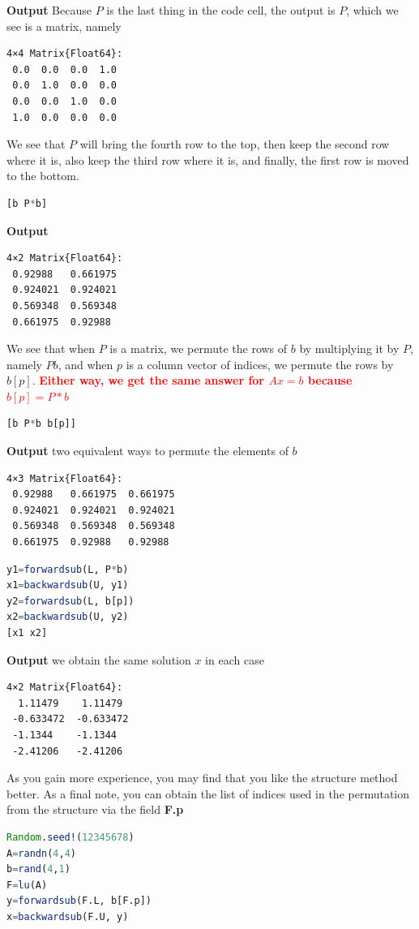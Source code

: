 \begin{itemize}
\textbf{Output} Because $P$ is the last thing in the code cell, the output is $P$, which we see is a matrix, namely
\begin{verbatim}
4×4 Matrix{Float64}:
 0.0  0.0  0.0  1.0
 0.0  1.0  0.0  0.0
 0.0  0.0  1.0  0.0
 1.0  0.0  0.0  0.0
\end{verbatim}
We see that $P$ will bring the fourth row to the top, then keep the second row where it is, also keep the third row where it is, and finally, the first row is moved to the bottom.
\begin{lstlisting}[language=Julia,style=mystyle]
[b P*b]
\end{lstlisting}
\textbf{Output}
\begin{verbatim}
4×2 Matrix{Float64}:
 0.92988   0.661975
 0.924021  0.924021
 0.569348  0.569348
 0.661975  0.92988
\end{verbatim}
We see that when $P$ is a matrix, we permute the rows of $b$ by multiplying it by $P$, namely $P b$,  and when $p$ is a column vector of indices, we permute the rows by $b[p]$. \textcolor{red}{\bf Either way, we get the same answer for $Ax=b$ because $b[p] = P*b$}
\begin{lstlisting}[language=Julia,style=mystyle]
[b P*b b[p]]
\end{lstlisting}
\textbf{Output} two equivalent ways to permute the elements of $b$
\begin{verbatim}
4×3 Matrix{Float64}:
 0.92988   0.661975  0.661975
 0.924021  0.924021  0.924021
 0.569348  0.569348  0.569348
 0.661975  0.92988   0.92988
 \end{verbatim}
\begin{lstlisting}[language=Julia,style=mystyle]
y1=forwardsub(L, P*b)
x1=backwardsub(U, y1)
y2=forwardsub(L, b[p])
x2=backwardsub(U, y2)
[x1 x2]
\end{lstlisting}
\textbf{Output} we obtain the same solution $x$ in each case
\begin{verbatim}
4×2 Matrix{Float64}:
  1.11479    1.11479
 -0.633472  -0.633472
 -1.1344    -1.1344
 -2.41206   -2.41206
 \end{verbatim}
As you gain more experience, you may find that you like the structure method better. As a final note, you can obtain the list of indices used in the permutation from the structure via the field \textbf{F.p}
\begin{lstlisting}[language=Julia,style=mystyle]
Random.seed!(12345678)
A=randn(4,4)
b=rand(4,1)
F=lu(A)
y=forwardsub(F.L, b[F.p])
x=backwardsub(F.U, y)
\end{lstlisting}

\end{itemize}
